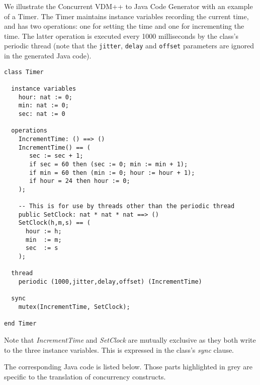 \documentclass[\pformat,11pt]{article}
\newcommand{\cg}{VDM++ to Java Code Generator}
\newcommand{\ccg}{Concurrent \cg}
\begin{document}
We illustrate the \ccg{} with an example of a Timer. The Timer maintains
instance variables recording the current time, and has two operations:
one for setting the time and one for incrementing the time. The latter
operation is executed every 1000 milliseconds by the class's periodic
thread (note that the \texttt{jitter}, \texttt{delay} and
\texttt{offset} parameters are ignored in the generated Java code). 
\begin{verbatim}
class Timer

  instance variables
    hour: nat := 0;
    min: nat := 0;
    sec: nat := 0
  
  operations
    IncrementTime: () ==> ()
    IncrementTime() == (
       sec := sec + 1;
       if sec = 60 then (sec := 0; min := min + 1);
       if min = 60 then (min := 0; hour := hour + 1);
       if hour = 24 then hour := 0;
    );
  
    -- This is for use by threads other than the periodic thread
    public SetClock: nat * nat * nat ==> ()
    SetClock(h,m,s) == ( 
      hour := h;
      min  := m;
      sec  := s
    );
  
  thread
    periodic (1000,jitter,delay,offset) (IncrementTime)

  sync 
    mutex(IncrementTime, SetClock);
   
end Timer
\end{verbatim}
Note that \textit{IncrementTime} and \textit{SetClock} are mutually
exclusive as they both write to the three instance variables. This is
expressed in the class's \textit{sync} clause.

The corresponding Java code is listed below. Those parts highlighted
in grey are specific to the translation of concurrency constructs.
\end{document}
